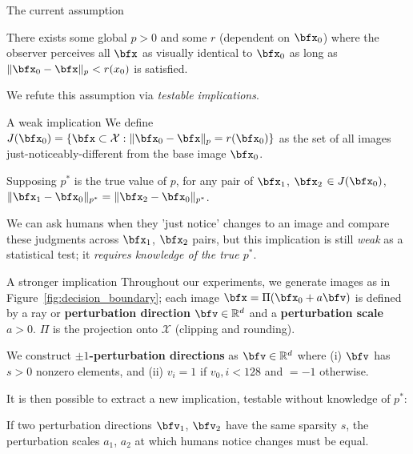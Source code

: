 \documentclass[final,notheorems]{beamer}
\newlength{\colwidth}
\providecommand{\norm}[1]{\lVert#1\rVert}
\def\X{\mathcal X}
\def\R{\mathbb R}
\begin{document}
\begin{frame}[t]
\begin{columns}[t]
\begin{column}{\colwidth}
\begin{alertblock}{The current assumption}
    \hspace*{.1\linewidth}\colorbox{highlightbg}{\begin{minipage}{.8\linewidth}
      There exists some global $p>0$ and some $r$ (dependent on $\bfx_0$) where the observer perceives all $\bfx$ as visually identical to $\bfx_0$ as long as $\norm{\bfx_0-\bfx}_p < r(x_0)$ is satisfied.
    \end{minipage}}

    We refute this assumption via \emph{testable implications}.
  \end{alertblock}

  \begin{block}{A weak implication}
    We define $J(\bfx_0) = \{\bfx \subset \X : \norm{\bfx_0-\bfx}_p = r(\bfx_0)\}$ as the set of all images just-noticeably-different from the base image $\bfx_0$.

    \hspace*{.1\linewidth}\colorbox{highlightbg}{\begin{minipage}{.8\linewidth}
      Supposing $p^*$ is the true value of $p$, for any pair of $\bfx_1$, $\bfx_2$ $\in J(\bfx_0)$, $\norm{\bfx_1-\bfx_0}_{p^*} = \norm{\bfx_2-\bfx_0}_{p^*}$.
    \end{minipage}}

    We can ask humans when they 'just notice' changes to an image and compare these judgments across $\bfx_1$, $\bfx_2$ pairs, but this implication is still \emph{weak} as a statistical test; it \emph{requires knowledge of the true $p^*$}.
  \end{block}

  \begin{block}{A stronger implication}
    Throughout our experiments, we generate images as in Figure~\ref{fig:decision_boundary};
    each image $\bfx = \Pi(\bfx_0+a\bfv)$ is defined by a ray or \textbf{perturbation direction} $\bfv \in \R^d$ and a \textbf{perturbation scale} $a>0$.
    $\Pi$ is the projection onto $\X$ (clipping and rounding).

    We construct \textbf{$\pm 1$-perturbation directions} as $\bfv\in\R^d$ where
    (i) $\bfv$ has $s>0$ nonzero elements, and
    (ii) $v_i = 1$ if $v_0,i < 128$ and $=-1$ otherwise.

    It is then possible to extract a new implication, testable without knowledge of $p^*$:

    \hspace*{.1\linewidth}\colorbox{highlightbg}{\begin{minipage}{.8\linewidth}
      If two perturbation directions $\bfv_1$, $\bfv_2$ have the same sparsity $s$, the perturbation scales $a_1$, $a_2$ at which humans notice changes must be equal.
    \end{minipage}}
  \end{block}


\end{column}
\end{columns}
\end{frame}
\end{document}
